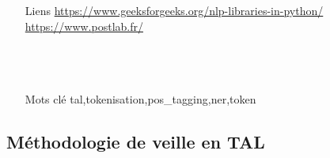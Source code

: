 \documentclass{book}
\begin{document}
\begin{itemize}
    \item [Liens]
        \url{https://www.geeksforgeeks.org/nlp-libraries-in-python/}%
        \url{https://www.postlab.fr/}\\
        \autocite{webster1992tokenization} \\%
        \autocite{straka-strakova-2017-tokenizing}\\%
        \autocite{sun2018overview}\\%
    \item [Mots clé]
        \gls{tal},\gls{tokenisation},\gls{pos_tagging},\gls{ner},\gls{token}
\end{itemize}



\subsection*{Méthodologie de veille en TAL}
\end{document}
